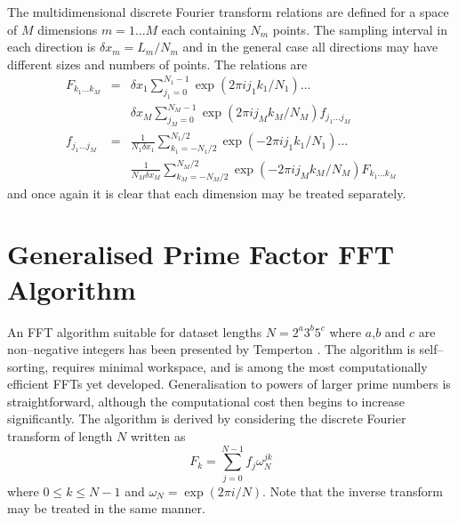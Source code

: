 \documentclass[dvips]{article}
\begin{document}
The multidimensional discrete Fourier transform relations are defined
for a space of $M$ dimensions $m = 1\ldots M$ each containing $N_{m}$
points.  The sampling interval in each direction is $\delta x_{m} =
L_{m}/N_{m}$ and in the general case all directions may have different
sizes and numbers of points.  The relations are
\begin{eqnarray}
F_{k_{1}\ldots k_{M}} & = &
\delta x_{1} \sum_{j_{1}=0}^{N_{1}-1} \exp{(2\pi ij_{1}k_{1}/N_{1})}\ldots
\nonumber \\ & &
\delta x_{M} \sum_{j_{M}=0}^{N_{M}-1} \exp{(2\pi ij_{M}k_{M}/N_{M})}
f_{j_{1}\ldots j_{M}} \\
f_{j_{1}\ldots j_{M}} & = &
\frac{1}{N_{1}\delta x_{1}}\sum_{k_{1}=-N_{1}/2}^{N_{1}/2}
\exp{(-2\pi ij_{1}k_{1}/N_{1})}\ldots
\nonumber \\ & &
\frac{1}{N_{M}\delta x_{M}}\sum_{k_{M}=-N_{M}/2}^{N_{M}/2}
\exp{(-2\pi ij_{M}k_{M}/N_{M})} 
F_{k_{1}\ldots k_{M}}
\end{eqnarray}
and once again it is clear that each dimension may be treated
separately.

\section*{Generalised Prime Factor FFT Algorithm}
An FFT algorithm suitable for dataset lengths $N =
2^{a}3^{b}5^{c}$ where $a$,$b$ and $c$ are non--negative integers has been
presented by Temperton \cite{temper1, temper2}.  The algorithm is
self--sorting, requires minimal workspace, and is among the most computationally
efficient FFTs yet developed.  Generalisation to powers of larger prime
numbers is straightforward, although the computational cost then begins to
increase significantly.  The algorithm is derived by considering the discrete
Fourier transform of length $N$ written as
\begin{equation}
F_{k} = \sum_{j=0}^{N-1} f_{j}\omega_{N}^{jk}
\label{DFTOMEGA}
\end{equation}
where $0\leq k \leq N-1$ and $\omega_{N} = \exp{(2\pi i/N)}$.  Note that
the inverse transform may be treated in the same manner.
\end{document}
